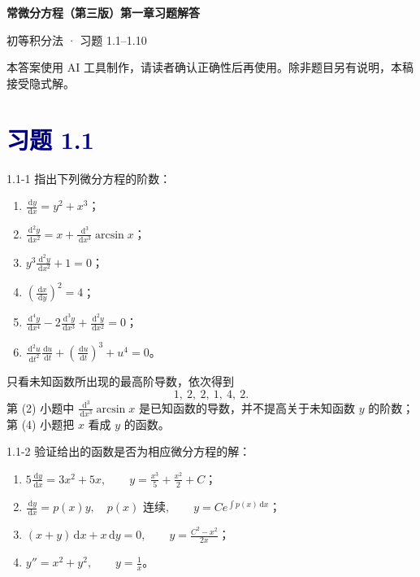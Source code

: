 \documentclass[UTF8,a4paper,11pt]{ctexart}
\newcommand{\dd}{\,\mathrm d}
\newcommand{\sect}[1]{\section*{\textcolor{navy}{习题 #1}}}
\begin{document}
\begin{center}
  {\LARGE\bfseries\color{navy}常微分方程（第三版）第一章习题解答\par}
  \vspace{0.35em}
  {\color{pink}初等积分法 · 习题 1.1--1.10\par}
\end{center}
\begin{center}
  \small\color{gray}本答案使用 AI 工具制作，请读者确认正确性后再使用。除非题目另有说明，本稿接受隐式解。
\end{center}
\sect{1.1}
\begin{problem}{1.1-1}
指出下列微分方程的阶数：
  \begin{enumerate}[label=(\arabic*)]
    \item $\displaystyle \frac{\dd y}{\dd x}=y^2+x^3$；
    \item $\displaystyle \frac{\dd^2y}{\dd x^2}=x+\frac{\dd^3}{\dd x^3}\arcsin x$；
    \item $\displaystyle y^3\frac{\dd^2y}{\dd x^2}+1=0$；
    \item $\displaystyle \left(\frac{\dd x}{\dd y}\right)^2=4$；
    \item $\displaystyle \frac{\dd^4y}{\dd x^4}-2\frac{\dd^3y}{\dd x^3}+\frac{\dd^2y}{\dd x^2}=0$；
    \item $\displaystyle \frac{\dd^2u}{\dd t^2}\frac{\dd u}{\dd t}+\left(\frac{\dd u}{\dd t}\right)^3+u^4=0$。
  \end{enumerate}
\end{problem}

\begin{solution}
只看未知函数所出现的最高阶导数，依次得到
\[
\boxed{1,\ 2,\ 2,\ 1,\ 4,\ 2}.
\]
第 (2) 小题中 $\frac{\dd^3}{\dd x^3}\arcsin x$ 是已知函数的导数，并不提高关于未知函数 $y$ 的阶数；第 (4) 小题把 $x$ 看成 $y$ 的函数。
\end{solution}

\begin{problem}{1.1-2}
验证给出的函数是否为相应微分方程的解：
  \begin{enumerate}[label=(\arabic*)]
    \item $\displaystyle 5\frac{\dd y}{\dd x}=3x^2+5x,\qquad y=\frac{x^3}{5}+\frac{x^2}{2}+C$；
    \item $\displaystyle \frac{\dd y}{\dd x}=p(x)y,\quad p(x)\text{ 连续},\qquad y=Ce^{\int p(x)\dd x}$；
    \item $\displaystyle (x+y)\dd x+x\dd y=0,\qquad y=\frac{C^2-x^2}{2x}$；
    \item $\displaystyle y''=x^2+y^2,\qquad y=\frac1x$。
  \end{enumerate}
\end{problem}
\end{document}
